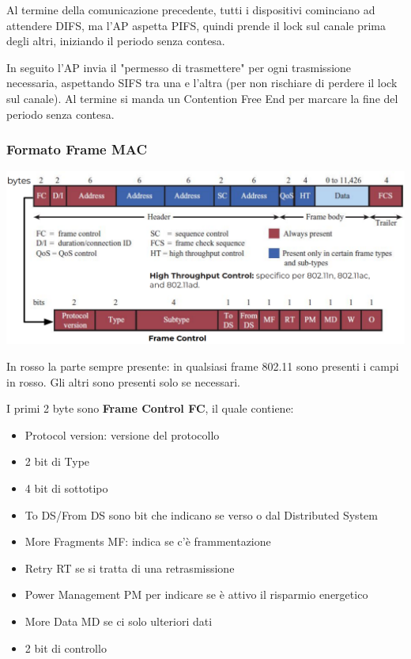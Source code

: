 Al termine della comunicazione precedente, tutti i dispositivi cominciano ad attendere DIFS, ma l'AP aspetta PIFS, quindi prende il lock sul canale prima degli altri, iniziando il periodo senza contesa. 

In seguito l'AP invia il "permesso di trasmettere" per ogni trasmissione necessaria, aspettando SIFS tra una e l'altra (per non rischiare di perdere il lock sul canale). Al termine si manda un Contention Free End per marcare la fine del periodo senza contesa.


\subsubsection{Formato Frame MAC}
\begin{center}
	\includegraphics[width=0.9\linewidth]{img/wlan/macframe}
\end{center}

In rosso la parte sempre presente: in qualsiasi frame 802.11 sono presenti i campi in rosso. Gli altri sono presenti solo se necessari.

I primi 2 byte sono \textbf{Frame Control FC}, il quale contiene:
\begin{itemize}
	\item Protocol version: versione del protocollo

	\item 2 bit di Type

	\item 4 bit di sottotipo

	\item To DS/From DS sono bit che indicano se verso o dal Distributed System

	\item More Fragments MF: indica se c'è frammentazione

	\item Retry RT se si tratta di una retrasmissione

	\item Power Management PM per indicare se è attivo il risparmio energetico

	\item More Data MD se ci solo ulteriori dati

	\item 2 bit di controllo
\end{itemize}

